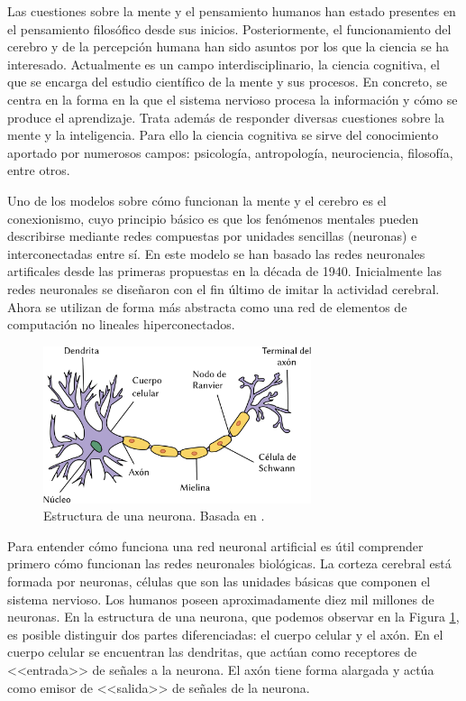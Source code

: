 \documentclass[
  a4paper,
  12pt,
  spanish,
]{scrartcl}
\theoremstyle{teorema-style}
\begin{document}
Las cuestiones sobre la mente y el pensamiento humanos han estado presentes en el pensamiento filosófico desde sus inicios.
Posteriormente, el funcionamiento del cerebro y de la percepción humana han sido asuntos por los que la ciencia se ha interesado.
Actualmente es un campo interdisciplinario, la ciencia cognitiva, el que se encarga del estudio científico de la mente y sus procesos.
En concreto, se centra en la forma en la que el sistema nervioso procesa la información y cómo se produce el aprendizaje.
Trata además de responder diversas cuestiones sobre la mente y la inteligencia.
Para ello la ciencia cognitiva se sirve del conocimiento aportado por numerosos campos: psicología, antropología, neurociencia, filosofía, entre otros.

Uno de los modelos sobre cómo funcionan la mente y el cerebro es el conexionismo, cuyo principio básico es que los fenómenos mentales pueden describirse mediante redes compuestas por unidades sencillas (neuronas) e interconectadas entre sí.
En este modelo se han basado las redes neuronales artificales desde las primeras propuestas en la década de 1940.
Inicialmente las redes neuronales se diseñaron con el fin último de imitar la actividad cerebral.
Ahora se utilizan de forma más abstracta como una red de elementos de computación no lineales hiperconectados.

\begin{figure}[h]
  \centering
  \includegraphics[width=0.7\textwidth]{img/neurona}
  \caption{Estructura de una neurona. Basada en \parencite{dhp1080_neurona_2007}.}
  \label{fig:neurona}
\end{figure}

Para entender cómo funciona una red neuronal artificial es útil comprender primero cómo funcionan las redes neuronales biológicas.
La corteza cerebral está formada por neuronas, células que son las unidades básicas que componen el sistema nervioso.
Los humanos poseen aproximadamente diez mil millones de neuronas.
En la estructura de una neurona, que podemos observar en la Figura \ref{fig:neurona}, es posible distinguir dos partes diferenciadas: el cuerpo celular y el axón.
En el cuerpo celular se encuentran las dendritas, que actúan como receptores de <<entrada>> de señales a la neurona.
El axón tiene forma alargada y actúa como emisor de <<salida>> de señales de la neurona.
\end{document}
